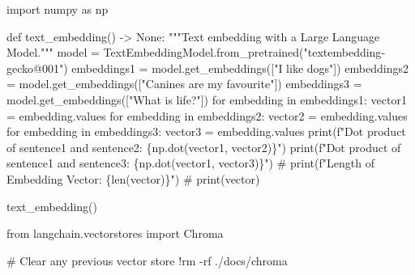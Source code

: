 \documentclass[
  letterpaper,
  DIV=11,
  numbers=noendperiod]{scrreprt}
\newenvironment{Shaded}{\begin{snugshade}}{\end{snugshade}}
\newcommand{\BuiltInTok}[1]{\textcolor[rgb]{0.00,0.23,0.31}{#1}}
\newcommand{\CommentTok}[1]{\textcolor[rgb]{0.37,0.37,0.37}{#1}}
\newcommand{\ControlFlowTok}[1]{\textcolor[rgb]{0.00,0.23,0.31}{#1}}
\newcommand{\ImportTok}[1]{\textcolor[rgb]{0.00,0.46,0.62}{#1}}
\newcommand{\KeywordTok}[1]{\textcolor[rgb]{0.00,0.23,0.31}{#1}}
\newcommand{\NormalTok}[1]{\textcolor[rgb]{0.00,0.23,0.31}{#1}}
\newcommand{\OperatorTok}[1]{\textcolor[rgb]{0.37,0.37,0.37}{#1}}
\newcommand{\SpecialCharTok}[1]{\textcolor[rgb]{0.37,0.37,0.37}{#1}}
\newcommand{\SpecialStringTok}[1]{\textcolor[rgb]{0.13,0.47,0.30}{#1}}
\newcommand{\StringTok}[1]{\textcolor[rgb]{0.13,0.47,0.30}{#1}}
\newcommand{\VariableTok}[1]{\textcolor[rgb]{0.07,0.07,0.07}{#1}}
\begin{document}
\begin{Shaded}
\begin{Highlighting}[]
\ImportTok{import}\NormalTok{ numpy }\ImportTok{as}\NormalTok{ np}

\KeywordTok{def}\NormalTok{ text\_embedding() }\OperatorTok{{-}\textgreater{}} \VariableTok{None}\NormalTok{:}
    \CommentTok{"""Text embedding with a Large Language Model."""}
\NormalTok{    model }\OperatorTok{=}\NormalTok{ TextEmbeddingModel.from\_pretrained(}\StringTok{"textembedding{-}gecko@001"}\NormalTok{)}
\NormalTok{    embeddings1 }\OperatorTok{=}\NormalTok{ model.get\_embeddings([}\StringTok{"I like dogs"}\NormalTok{])}
\NormalTok{    embeddings2 }\OperatorTok{=}\NormalTok{ model.get\_embeddings([}\StringTok{"Canines are my favourite"}\NormalTok{])}
\NormalTok{    embeddings3 }\OperatorTok{=}\NormalTok{ model.get\_embeddings([}\StringTok{"What is life?"}\NormalTok{])}
    \ControlFlowTok{for}\NormalTok{ embedding }\KeywordTok{in}\NormalTok{ embeddings1:}
\NormalTok{        vector1 }\OperatorTok{=}\NormalTok{ embedding.values}
    \ControlFlowTok{for}\NormalTok{ embedding }\KeywordTok{in}\NormalTok{ embeddings2:}
\NormalTok{        vector2 }\OperatorTok{=}\NormalTok{ embedding.values}
    \ControlFlowTok{for}\NormalTok{ embedding }\KeywordTok{in}\NormalTok{ embeddings3:}
\NormalTok{        vector3 }\OperatorTok{=}\NormalTok{ embedding.values}
    \BuiltInTok{print}\NormalTok{(}\SpecialStringTok{f"Dot product of sentence1 and sentence2: }\SpecialCharTok{\{}\NormalTok{np}\SpecialCharTok{.}\NormalTok{dot(vector1, vector2)}\SpecialCharTok{\}}\SpecialStringTok{"}\NormalTok{)}
    \BuiltInTok{print}\NormalTok{(}\SpecialStringTok{f"Dot product of sentence1 and sentence3: }\SpecialCharTok{\{}\NormalTok{np}\SpecialCharTok{.}\NormalTok{dot(vector1, vector3)}\SpecialCharTok{\}}\SpecialStringTok{"}\NormalTok{)}
    \CommentTok{\# print(f"Length of Embedding Vector: \{len(vector)\}")}
    \CommentTok{\# print(vector)}
\end{Highlighting}
\end{Shaded}

\begin{Shaded}
\begin{Highlighting}[]
\NormalTok{text\_embedding()}
\end{Highlighting}
\end{Shaded}

\begin{Shaded}
\begin{Highlighting}[]
\ImportTok{from}\NormalTok{ langchain.vectorstores }\ImportTok{import}\NormalTok{ Chroma}

\CommentTok{\# Clear any previous vector store}
\OperatorTok{!}\NormalTok{rm }\OperatorTok{{-}}\NormalTok{rf .}\OperatorTok{/}\NormalTok{docs}\OperatorTok{/}\NormalTok{chroma}
\end{Highlighting}
\end{Shaded}
\end{document}
